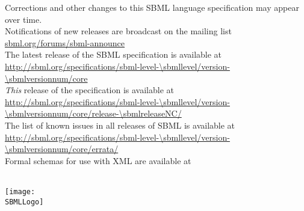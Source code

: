 

\maketitle


\vspace*{-4pt}
\begin{center}\sffamily
Corrections and other changes to this SBML language specification may appear over time.\\
Notifications of new releases are broadcast on the mailing list \href{http://www.sbml.org/Forums/sbml-announce}{sbml.org/forums/sbml-announce}\\[8pt]

The latest release of the SBML \thisLV specification is available at\\
\url{http://sbml.org/specifications/sbml-level-\sbmllevel/version-\sbmlversionnum/core}\\[8pt]

\emph{This} release of the specification is available at\\
\url{http://sbml.org/specifications/sbml-level-\sbmllevel/version-\sbmlversionnum/core/release-\sbmlreleaseNC/}\\[8pt]

The list of known issues in all releases of SBML \thisLV is available at\\
\url{http://sbml.org/specifications/sbml-level-\sbmllevel/version-\sbmlversionnum/core/errata/}\\[8pt]

Formal schemas for use with XML are available at\\
\sbmlSchemasURL\\[8pt]
\end{center}

\vfill

\vspace*{10pt}
\centerline{\texttt{[image: \\SBMLLogo]}}
